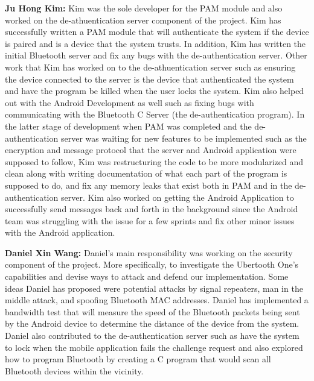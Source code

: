 \documentclass[letterpaper,twocolumn,10pt]{article}
\begin{document}
{{\textbf{Ju Hong Kim:} Kim was the sole developer for the PAM module and also worked on the de-athuentication server component of the project. Kim has successfully written a PAM module that will authenticate the system if the device is paired and is a device that the system trusts. In addition, Kim has written the initial Bluetooth server and fix any bugs with the de-authentication server. Other work that Kim has worked on to the de-athuentication server such as ensuring the device connected to the server is the device that authenticated the system and have the program be killed when the user locks the system. Kim also helped out with the Android Development as well such as fixing bugs with communicating with the Bluetooth C Server (the de-authentication program). In the latter stage of development when PAM  was completed and the de-authentication server was waiting for new features to be implemented such as the encryption and message protocol that the server and Android application were supposed to follow, Kim was restructuring the code to be more modularized and clean along with writing documentation of what each part of the program is supposed to do, and fix any memory leaks that exist both in PAM and in the de-authentication server. Kim also worked on getting the Android Application to successfully send messages back and forth in the background since the Android team was struggling with the issue for a few sprints and fix other minor issues with the Android application.

\textbf{Daniel Xin Wang:} Daniel's main responsibility was working on the security component of the project. More specifically, to investigate the Ubertooth One's capabilities and devise ways to attack and defend our implementation. Some ideas Daniel has proposed were potential attacks by signal repeaters, man in the middle attack, and spoofing Bluetooth MAC addresses. Daniel has implemented a bandwidth test that will measure the speed of the Bluetooth packets being sent by the Android device to determine the distance of the device from the system. Daniel also contributed to the de-authentication server such as have the system to lock when the mobile application fails the challenge request and also explored how to program Bluetooth by creating a C program that would scan all Bluetooth devices within the vicinity.

}}
\end{document}
